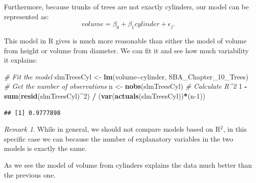 \documentclass[
]{book}
\newenvironment{Shaded}{\begin{snugshade}}{\end{snugshade}}
\newcommand{\CommentTok}[1]{\textcolor[rgb]{0.56,0.35,0.01}{\textit{#1}}}
\newcommand{\DecValTok}[1]{\textcolor[rgb]{0.00,0.00,0.81}{#1}}
\newcommand{\FunctionTok}[1]{\textcolor[rgb]{0.13,0.29,0.53}{\textbf{#1}}}
\newcommand{\NormalTok}[1]{#1}
\newcommand{\OtherTok}[1]{\textcolor[rgb]{0.56,0.35,0.01}{#1}}
\newcommand{\SpecialCharTok}[1]{\textcolor[rgb]{0.81,0.36,0.00}{\textbf{#1}}}
\theoremstyle{definition}
\theoremstyle{definition}
\theoremstyle{definition}
\theoremstyle{definition}
\theoremstyle{remark}
\newtheorem*{remark}{Remark}
\begin{document}
\begin{Shaded}
\end{Shaded}

Furthermore, because trunks of trees are not exactly cylinders, our model can be represented as:
\begin{equation*}
    volume = \beta_0 + \beta_1 cylinder + \epsilon_j.
\end{equation*}

This model in R gives is much more reasonable than either the model of volume from height or volume from diameter. We can fit it and see how much variability it explains:

\begin{Shaded}
\begin{Highlighting}[]
\CommentTok{\# Fit the model}
\NormalTok{slmTreesCyl }\OtherTok{\textless{}{-}} \FunctionTok{lm}\NormalTok{(volume}\SpecialCharTok{\textasciitilde{}}\NormalTok{cylinder, SBA\_Chapter\_10\_Trees)}
\CommentTok{\# Get the number of observations}
\NormalTok{n }\OtherTok{\textless{}{-}} \FunctionTok{nobs}\NormalTok{(slmTreesCyl)}
\CommentTok{\# Calculate R\^{}2}
\DecValTok{1} \SpecialCharTok{{-}} \FunctionTok{sum}\NormalTok{(}\FunctionTok{resid}\NormalTok{(slmTreesCyl)}\SpecialCharTok{\^{}}\DecValTok{2}\NormalTok{) }\SpecialCharTok{/}\NormalTok{ (}\FunctionTok{var}\NormalTok{(}\FunctionTok{actuals}\NormalTok{(slmTreesCyl))}\SpecialCharTok{*}\NormalTok{(n}\DecValTok{{-}1}\NormalTok{))}
\end{Highlighting}
\end{Shaded}

\begin{verbatim}
## [1] 0.9777898
\end{verbatim}

\begin{remark}
While in general, we should not compare models based on R\(^2\), in this specific case we can because the number of explanatory variables in the two models is exactly the same.
\end{remark}

As we see the model of volume from cylinders explains the data much better than the previous one.
\end{document}
